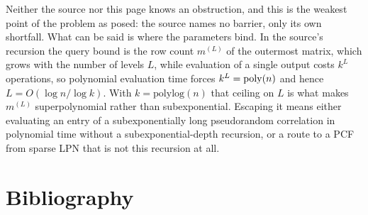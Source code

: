 \documentclass{aicr-conjecture}
\begin{document}
\begin{remark}
Neither the source nor this page knows an obstruction, and this is the
weakest point of the problem as posed: the source names no barrier, only
its own shortfall. What can be said is where the parameters bind. In the
source's recursion the query bound is the row count $m^{(L)}$ of the
outermost matrix, which grows with the number of levels $L$, while
evaluation of a single output costs $k^{L}$ operations, so polynomial
evaluation time forces $k^{L} = \mathrm{poly}(n)$ and hence
$L = O(\log n / \log k)$. With $k = \mathrm{polylog}(n)$ that ceiling on
$L$ is what makes $m^{(L)}$ superpolynomial rather than subexponential.
Escaping it means either evaluating an entry of a subexponentially long
pseudorandom correlation in polynomial time without a
subexponential-depth recursion, or a route to a PCF from sparse LPN that
is not this recursion at all.
\end{remark}

\section{Bibliography}
\end{document}
